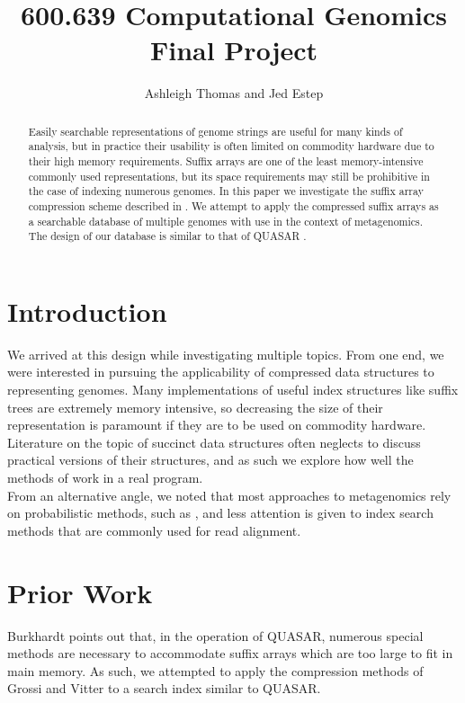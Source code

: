 \documentclass{article}
\begin{document}
\title{600.639 Computational Genomics\\
Final Project}
\date{}
\author{Ashleigh Thomas and Jed Estep}
\maketitle

\begin{abstract}
Easily searchable representations of genome strings are useful for many kinds of analysis, but in practice their usability is often limited on commodity hardware due to their high memory requirements. Suffix arrays are one of the least memory-intensive commonly used representations, but its space requirements may still be prohibitive in the case of indexing numerous genomes. In this paper we investigate the suffix array compression scheme described in \cite{GV05}. We attempt to apply the compressed suffix arrays as a searchable database of multiple genomes with use in the context of metagenomics. The design of our database is similar to that of QUASAR \cite{B99}.
\end{abstract}
\section{Introduction}
\indent We arrived at this design while investigating multiple topics. From one end, we were interested in pursuing the applicability of compressed data structures to representing genomes. Many implementations of useful index structures like suffix trees are extremely memory intensive, so decreasing the size of their representation is paramount if they are to be used on commodity hardware. Literature on the topic of succinct data structures often neglects to discuss practical versions of their structures, and as such we explore how well the methods of \cite{GV05} work in a real program.\\
\indent From an alternative angle, we noted that most approaches to metagenomics rely on probabilistic methods, such as \cite{BS09}, and less attention is given to index search methods that are commonly used for read alignment. 

\section{Prior Work}
Burkhardt \cite{B99} points out that, in the operation of QUASAR, numerous special methods are necessary to accommodate suffix arrays which are too large to fit in main memory. As such, we attempted to apply the compression methods of Grossi and Vitter \cite{GV05} to a search index similar to QUASAR.\\
\end{document}
